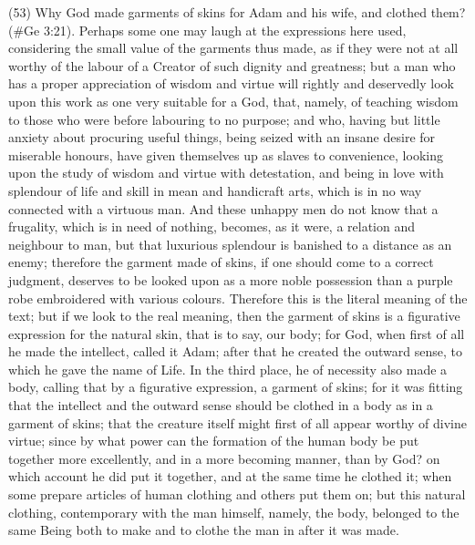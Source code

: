 (53) Why God made garments of skins for Adam and his wife, and clothed them? (\#Ge 3:21).
Perhaps some one may laugh at the expressions here used, considering the small value of the
garments thus made, as if they were not at all worthy of the labour of a Creator of such dignity and
greatness; but a man who has a proper appreciation of wisdom and virtue will rightly and
deservedly look upon this work as one very suitable for a God, that, namely, of teaching wisdom to
those who were before labouring to no purpose; and who, having but little anxiety about procuring
useful things, being seized with an insane desire for miserable honours, have given themselves up
as slaves to convenience, looking upon the study of wisdom and virtue with detestation, and being
in love with splendour of life and skill in mean and handicraft arts, which is in no way connected with
a virtuous man. And these unhappy men do not know that a frugality, which is in need of nothing,
becomes, as it were, a relation and neighbour to man, but that luxurious splendour is banished to a
distance as an enemy; therefore the garment made of skins, if one should come to a correct
judgment, deserves to be looked upon as a more noble possession than a purple robe
embroidered with various colours. Therefore this is the literal meaning of the text; but if we look to
the real meaning, then the garment of skins is a figurative expression for the natural skin, that is to
say, our body; for God, when first of all he made the intellect, called it Adam; after that he created
the outward sense, to which he gave the name of Life. In the third place, he of necessity also made
a body, calling that by a figurative expression, a garment of skins; for it was fitting that the intellect
and the outward sense should be clothed in a body as in a garment of skins; that the creature itself
might first of all appear worthy of divine virtue; since by what power can the formation of the human
body be put together more excellently, and in a more becoming manner, than by God? on which
account he did put it together, and at the same time he clothed it; when some prepare articles of
human clothing and others put them on; but this natural clothing, contemporary with the man
himself, namely, the body, belonged to the same Being both to make and to clothe the man in after
it was made.

